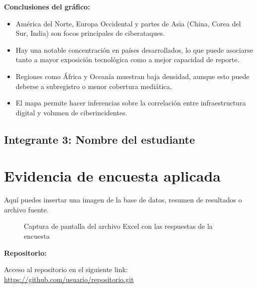 \documentclass[12pt, a4paper]{article}
\begin{document}
\vspace{0.5em}
\textbf{Conclusiones del gráfico:} \\
\begin{itemize}
    \item América del Norte, Europa Occidental y partes de Asia (China, Corea del Sur, India) son focos principales de ciberataques.
    \item Hay una notable concentración en países desarrollados, lo que puede asociarse tanto a mayor exposición tecnológica como a mejor capacidad de reporte.
    \item Regiones como África y Oceanía muestran baja densidad, aunque esto puede deberse a subregistro o menor cobertura mediática.
    \item El mapa permite hacer inferencias sobre la correlación entre infraestructura digital y volumen de ciberincidentes.
\end{itemize}

\newpage
\subsection*{Integrante 3: Nombre del estudiante}


\section{Evidencia de encuesta aplicada}
Aquí puedes insertar una imagen de la base de datos, resumen de resultados o archivo fuente.

\begin{figure}[H]
    \centering
    \caption{Captura de pantalla del archivo Excel con las respuestas de la encuesta}
\end{figure}


\textbf{Repositorio:}  
\label{anexo:repositorio}

Acceso al repositorio en el siguiente link:  
\url{https://github.com/usuario/repositorio.git}
\end{document}
